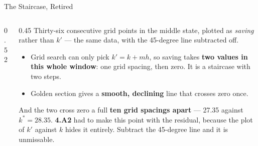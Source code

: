 \begin{frame}{The Staircase, Retired}
\begin{columns}[c]
\begin{column}{0.52\textwidth}
\end{column}
\begin{column}{0.45\textwidth}
\small
Thirty-six consecutive grid points in the middle state, plotted as \emph{saving} rather than $k'$ --- the same data, with the 45-degree line subtracted off.
\medskip
\begin{itemize}\footnotesize
  \item Grid search can only pick $k'=k+mh$, so saving takes \textbf{two values in this whole window}: one grid spacing, then zero. It is a staircase with two steps.
  \item Golden section gives a \textbf{smooth, declining} line that crosses zero once.
\end{itemize}
\medskip
\begin{cautionbox}\footnotesize
And the two cross zero a full \textbf{ten grid spacings apart} --- 27.35 against $k^{*}=28.35$. \textbf{4.A2} had to make this point with the residual, because the plot of $k'$ against $k$ hides it entirely. Subtract the 45-degree line and it is unmissable.
\end{cautionbox}
\end{column}
\end{columns}
\end{frame}

